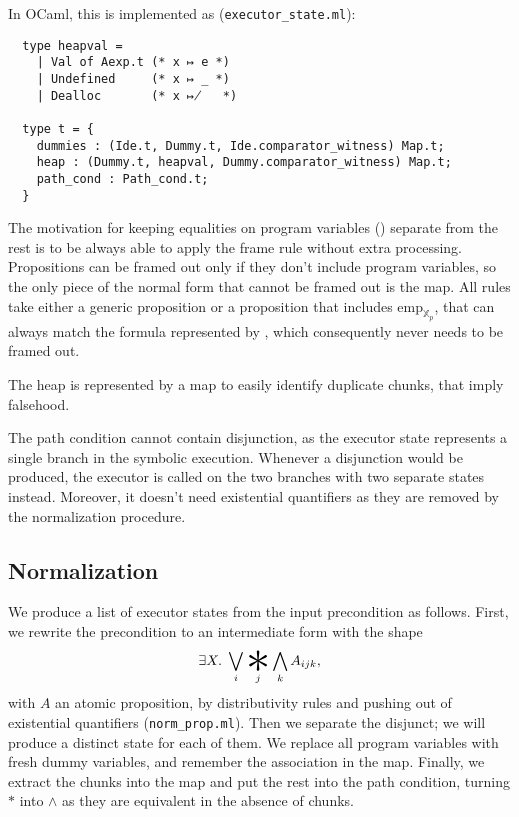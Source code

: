 \documentclass[parskip=half]{scrartcl}
\begin{document}
In OCaml, this is implemented as (\texttt{executor\_state.ml}):
\begin{verbatim}
  type heapval =
    | Val of Aexp.t (* x ↦ e *)
    | Undefined     (* x ↦ _ *)
    | Dealloc       (* x ↦̸   *)

  type t = {
    dummies : (Ide.t, Dummy.t, Ide.comparator_witness) Map.t;
    heap : (Dummy.t, heapval, Dummy.comparator_witness) Map.t;
    path_cond : Path_cond.t;
  }
\end{verbatim}

The motivation for keeping equalities on program variables () separate from the rest is to be always able to apply the frame rule without extra processing. Propositions can be framed out only if they don't include program variables, so the only piece of the normal form that cannot be framed out is the  map. All rules take either a generic proposition or a proposition that includes \(\mathrm{emp}_{\mathbb X_{p}}\), that can always match the formula represented by , which consequently never needs to be framed out.

The heap is represented by a map to easily identify duplicate chunks, that imply falsehood.

The path condition cannot contain disjunction, as the executor state represents a single branch in the symbolic execution. Whenever a disjunction would be produced, the executor is called on the two branches with two separate states instead. Moreover, it doesn't need existential quantifiers as they are removed by the normalization procedure.

\subsection{Normalization}

We produce a list of executor states from the input precondition as follows.
First, we rewrite the precondition to an intermediate form with the shape
\[\exists X.\;\bigvee_{i}\bigast_{j}\bigwedge_{k} A_{ijk},\]
with \(A\) an atomic proposition, by distributivity rules and pushing out of existential quantifiers (\texttt{norm\_prop.ml}). Then we separate the disjunct; we will produce a distinct state for each of them. We replace all program variables with fresh dummy variables, and remember the association in the  map. Finally, we extract the chunks into the  map and put the rest into the path condition, turning \(\ast\) into \(\wedge\) as they are equivalent in the absence of chunks.
\end{document}

